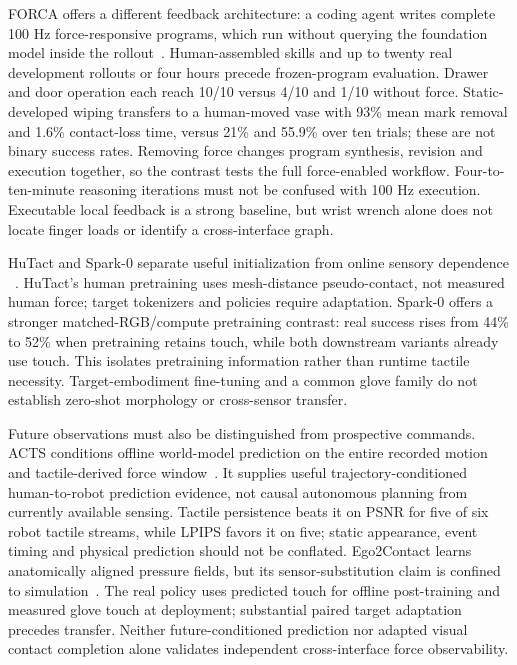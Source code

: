 FORCA offers a different feedback architecture: a coding agent writes complete
100 Hz force-responsive programs, which run without querying the foundation model
inside the rollout~\cite{update2026forca}. Human-assembled skills and up to
twenty real development rollouts or four hours precede frozen-program evaluation.
Drawer and door operation each reach 10/10 versus 4/10 and 1/10 without force.
Static-developed wiping transfers to a human-moved vase with 93\% mean mark
removal and 1.6\% contact-loss time, versus 21\% and 55.9\% over ten trials;
these are not binary success rates. Removing force changes program synthesis,
revision and execution together, so the contrast tests the full force-enabled
workflow. Four-to-ten-minute reasoning iterations must not be confused with
100 Hz execution. Executable local feedback is a strong baseline, but wrist
wrench alone does not locate finger loads or identify a cross-interface graph.

HuTact and Spark-0 separate useful initialization from online sensory dependence
~\cite{update2026hutact,update2026spark0}. HuTact's human pretraining uses
mesh-distance pseudo-contact, not measured human force; target tokenizers and
policies require adaptation. Spark-0 offers a stronger matched-RGB/compute
pretraining contrast: real success rises from 44\% to 52\% when pretraining
retains touch, while both downstream variants already use touch. This isolates
pretraining information rather than runtime tactile necessity. Target-embodiment
fine-tuning and a common glove family do not establish zero-shot morphology or
cross-sensor transfer.

Future observations must also be distinguished from prospective commands.
ACTS conditions offline world-model prediction on the entire recorded motion
and tactile-derived force window~\cite{update2026acts}. It supplies useful
trajectory-conditioned human-to-robot prediction evidence, not causal autonomous
planning from currently available sensing. Tactile persistence beats it on PSNR
for five of six robot tactile streams, while LPIPS favors it on five;
static appearance, event timing and physical prediction should not be conflated.
Ego2Contact learns anatomically aligned pressure fields, but its sensor-substitution
claim is confined to simulation~\cite{update2026ego2contact}. The real policy uses
predicted touch for offline post-training and measured glove touch at deployment;
substantial paired target adaptation precedes transfer. Neither future-conditioned
prediction nor adapted visual contact completion alone validates independent
cross-interface force observability.
